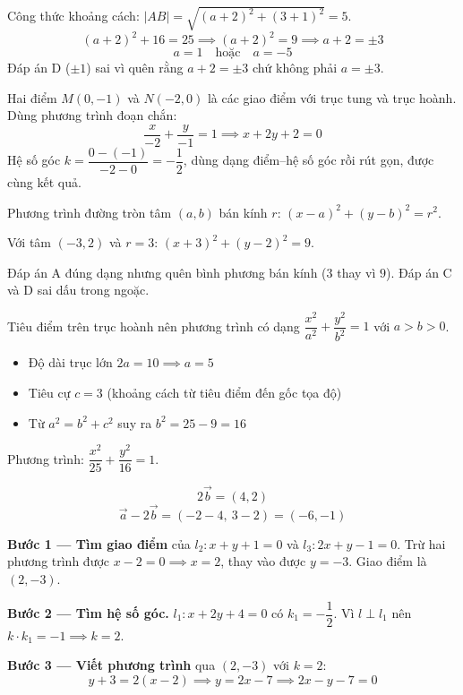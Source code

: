 \documentclass[11pt, a4paper]{article}
\begin{document}
\begin{dapan}[14 — Đáp án A]
Công thức khoảng cách: $|AB|=\sqrt{(a+2)^2+(3+1)^2}=5$.
\[
(a+2)^2+16=25 \implies (a+2)^2=9 \implies a+2=\pm 3
\]
\[
a=1 \quad \text{hoặc} \quad a=-5
\]
 Đáp án D ($\pm 1$) sai vì quên rằng $a+2=\pm3$ chứ không phải $a=\pm3$.
\end{dapan}

\begin{dapan}[15 — Đáp án B]
Hai điểm $M(0,-1)$ và $N(-2,0)$ là các giao điểm với trục tung và trục hoành. Dùng phương trình đoạn chắn:
\[
\frac{x}{-2}+\frac{y}{-1}=1 \implies x+2y+2=0
\]
 Hệ số góc $k=\dfrac{0-(-1)}{-2-0}=-\dfrac{1}{2}$, dùng dạng điểm–hệ số góc rồi rút gọn, được cùng kết quả.
\end{dapan}

\begin{dapan}[16 — Đáp án B]
Phương trình đường tròn tâm $(a,b)$ bán kính $r$: $(x-a)^2+(y-b)^2=r^2$.

Với tâm $(-3,2)$ và $r=3$: $(x+3)^2+(y-2)^2=9$.

 Đáp án A đúng dạng nhưng quên bình phương bán kính ($3$ thay vì $9$). Đáp án C và D sai dấu trong ngoặc.
\end{dapan}

\begin{dapan}[17 — Đáp án B]
Tiêu điểm trên trục hoành nên phương trình có dạng $\dfrac{x^2}{a^2}+\dfrac{y^2}{b^2}=1$ với $a>b>0$.

\begin{itemize}[leftmargin=1.4em, itemsep=2pt]
\item Độ dài trục lớn $2a=10 \implies a=5$
\item Tiêu cự $c=3$ (khoảng cách từ tiêu điểm đến gốc tọa độ)
\item Từ $a^2=b^2+c^2$ suy ra $b^2=25-9=16$
\end{itemize}

Phương trình: $\dfrac{x^2}{25}+\dfrac{y^2}{16}=1$.
\end{dapan}

\begin{dapan}[18 — Đáp án A]
\[
2\vec{b}=(4,2)
\]
\[
\vec{a}-2\vec{b}=(-2-4,\ 3-2)=(-6,-1)
\]
\end{dapan}

\begin{dapan}[19 — Đáp án A]
\textbf{Bước 1 — Tìm giao điểm} của $l_2: x+y+1=0$ và $l_3: 2x+y-1=0$. Trừ hai phương trình được $x-2=0 \implies x=2$, thay vào được $y=-3$. Giao điểm là $(2,-3)$.

\textbf{Bước 2 — Tìm hệ số góc.} $l_1: x+2y+4=0$ có $k_1=-\dfrac{1}{2}$. Vì $l \perp l_1$ nên $k \cdot k_1=-1 \implies k=2$.

\textbf{Bước 3 — Viết phương trình} qua $(2,-3)$ với $k=2$:
\[
y+3=2(x-2) \implies y=2x-7 \implies 2x-y-7=0
\]
\end{dapan}
\end{document}
